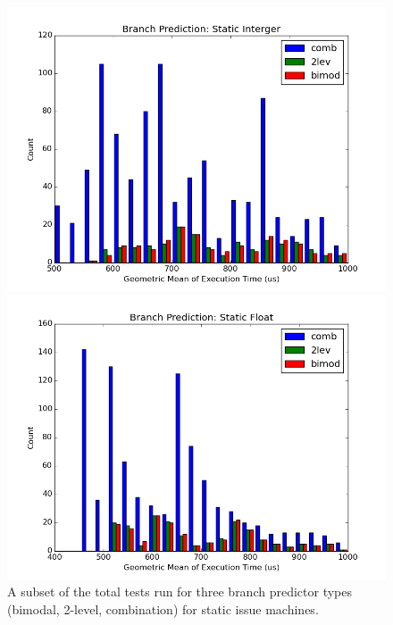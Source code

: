 \documentclass[paper=a4, fontsize=12pt]{scrartcl} %
\numberwithin{equation}{section} %
\numberwithin{figure}{section} %
\numberwithin{table}{section} %
\begin{document}
\begin{figure}
\centering
\begin{minipage}{0.5\textwidth}
\centering
	\includegraphics[width=\linewidth]{graphs/branch_prediction/Branch_Prediction_Static_Interger.png}
\end{minipage}\hfill
\begin{minipage}{0.5\textwidth}
\centering
 \includegraphics[width=\linewidth]{graphs/branch_prediction/Branch_Prediction_Static_Float.png}
\end{minipage}

\caption{A subset of the total tests run for three branch predictor types (bimodal, 2-level, combination) for static issue machines.}
\label{fig:bpsi}
\end{figure}
\end{document}
